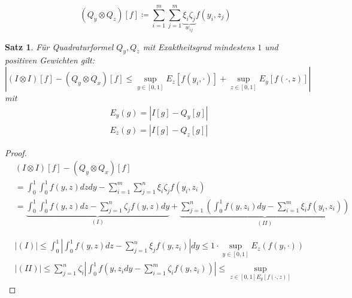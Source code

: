 \documentclass{book}
\newtheorem{theorem}[algorithm]{Satz}
\begin{document}
            \begin{equation*}
                (Q_y\otimes Q_z)[f]\coloneqq \sum_{i=1}^m\sum_{j=1}^m \underbrace{\xi_i \zeta_j}_{w_{ij}} f(y_i,z_j)
            \end{equation*}


            \begin{theorem}\label{s517}
                Für Quadraturformel $Q_y,Q_z$ mit Exaktheitsgrad mindestens $1$ und positiven Gewichten gilt:
                \begin{equation*}
                    \left\vert (I\otimes I)[f]-(Q_y\otimes Q_x)[f]\leq\sup_{y\in [0,1]} E_z[f(y_i,\cdot)]+\sup_{z\in[0,1]} E_y[f(\cdot,z)] \right\vert
                \end{equation*}
                mit 
                \begin{align*}
                    &E_y(g)=\left\vert I[g]-Q_y[g] \right\vert\\
                    &E_z(g)=\left\vert I[g]-Q_z[g] \right\vert
                \end{align*}
            \end{theorem}

            \begin{proof}
                \begin{align*}
                   & (I\otimes I)[f]-(Q_y\otimes Q_x)[f] \\
                   &=\int_0^1\int_0^1 f(y,z)dzdy -\sum_{i=1}^m\sum_{j=1}^n \xi_i\zeta_j f(y_i,z_i)\\
                   &=\underbrace{\int_0^1\int_0^1 f(y,z) dz-\sum_{j=1}^n \zeta_j f(y,z)dy}_{(I)}+\underbrace{\sum_{j=1}^n\left(\int_0^1 f(y,z_i)dy-\sum_{i=1}^m \xi_i f(y_i,z_i)\right)}_{(II)}
                \end{align*}

                \begin{align*}
                    &\left\vert (I) \right\vert \leq \int_0^1 \left\vert \int_0^1 f(y,z) dz-\sum_{j=1}^n\xi_j f(y,z_i) \right\vert dy\leq 1\cdot \sup_{y\in[0,1]} E_z(f(y,\cdot))\\
                    &\left\vert (II) \right\vert\leq \sum_{j=1}^n\zeta_i \left\vert \int_0^1 f(y,z_i dy-\sum_{i=1}^m\zeta_i f(y,z_i)) \right\vert \leq \sup_{z\in[0,1] E_y[f(\cdot,z)]}
                \end{align*}
            \end{proof}
\end{document}

